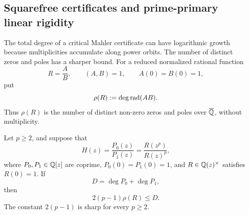 \subsection{Squarefree certificates and prime-primary linear rigidity}
\label{sec:linear-collision-rigidity}

The total degree of a critical Mahler certificate can have logarithmic
growth because multiplicities accumulate along power orbits.  The number of
distinct zeros and poles has a sharper bound.  For a reduced normalized
rational function
\[
 R=\frac AB,
 \qquad (A,B)=1,
 \qquad A(0)=B(0)=1,
\]
put
\[
 \rho(R):=\deg\operatorname{rad}(AB).
\]
Thus \(\rho(R)\) is the number of distinct non-zero zeros and poles over
\(\overline{\mathbb{Q}}\), without multiplicity.

\begin{theorem}
\label{thm:squarefree-mahler-bound}
Let \(p\ge2\), and suppose that
\begin{equation}\label{eq:squarefree-mahler-coboundary}
 H(z)=\frac{P_0(z)}{P_1(z)}
 =\frac{R(z^p)}{R(z)^p},
\end{equation}
where \(P_0,P_1\in\mathbb{Q}[z]\) are coprime,
\(P_0(0)=P_1(0)=1\), and \(R\in\mathbb{Q}(z)^\times\) satisfies \(R(0)=1\).
If
\[
 D=\deg P_0+\deg P_1,
\]
then
\begin{equation}\label{eq:sharp-squarefree-mahler-bound}
 2(p-1)\rho(R)\le D.
\end{equation}
The constant \(2(p-1)\) is sharp for every \(p\ge2\).
\end{theorem}

